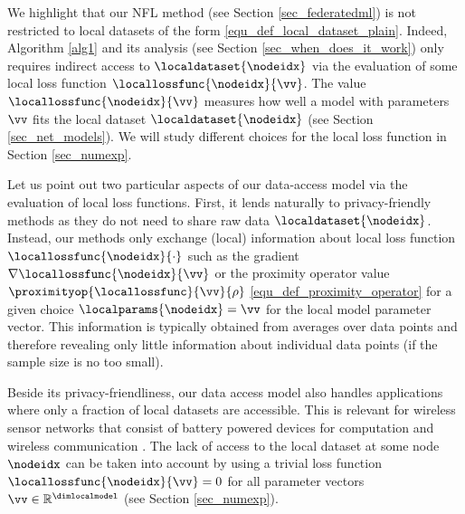 \documentclass[lettersize,journal]{IEEEtran}
\begin{document}
We highlight that our NFL method (see Section \ref{sec_federatedml}) is not restricted to local 
datasets of the form \eqref{equ_def_local_dataset_plain}. Indeed, Algorithm \ref{alg1} and its 
analysis (see Section \ref{sec_when_does_it_work}) only requires indirect access to $\localdataset{\nodeidx}$ 
via the evaluation of some local loss function $\locallossfunc{\nodeidx}{\vv}$. 
The value $\locallossfunc{\nodeidx}{\vv}$ measures how well a model with parameters $\vv$ fits the 
local dataset $\localdataset{\nodeidx}$ (see Section \ref{sec_net_models}). We will study different 
choices for the local loss function in Section \ref{sec_numexp}. 

Let us point out two particular aspects of our data-access model via the evaluation of local loss functions. 
First, it lends naturally to privacy-friendly methods as they do not need to share raw data $\localdataset{\nodeidx}$. 
Instead, our methods only exchange (local) information about local loss function $\locallossfunc{\nodeidx}{\cdot}$ 
such as the gradient $\nabla \locallossfunc{\nodeidx}{\vv}$ or the proximity operator value $\proximityop{\locallossfunc}{\vv}{\rho}$ \eqref{equ_def_proximity_operator}
for a given choice $\localparams{\nodeidx}=\vv$ for the local model parameter vector. This information is 
typically obtained from averages over data points and therefore revealing only little information about 
individual data points (if the sample size is no too small). 

Beside its privacy-friendliness, our data access model also handles applications where only 
a fraction of local datasets are accessible. This is relevant for wireless sensor networks that consist of battery powered devices for 
computation and wireless communication \cite{Mahmoudi202}. The lack of access to the 
local dataset at some node $\nodeidx$ can be taken into account by using a trivial loss function $\locallossfunc{\nodeidx}{\vv}  =0$ 
for all parameter vectors $\vv \in \mathbb{R}^{\dimlocalmodel}$ (see Section \ref{sec_numexp}). %


\end{document}
